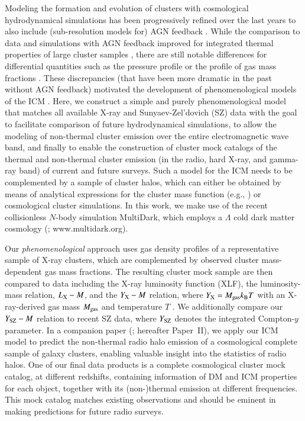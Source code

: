 \documentclass[useAMS,usenatbib]{mn2e}
\begin{document}
{  Modeling the formation and evolution of clusters with cosmological
  hydrodynamical simulations has been progressively refined over the last years
  to also include (sub-resolution models for) AGN feedback
  \citep[e.g.,][]{2007MNRAS.380..877S, 2008MNRAS.387.1403S, 2008ApJ...687L..53P,
    2012MNRAS.420.2662D, 2012MNRAS.424..190G, 2013MNRAS.428.2366V}. While the
  comparison to data and simulations with AGN feedback improved for integrated
  thermal properties of large cluster samples
  \citep{2012ApJ...758...74B,2012ApJ...758...75B}, there are still notable
  differences for differential quantities such as the pressure profile
  \citep{2013A&A...550A.131P} or the profile of gas mass fractions
  \citep{2012arXiv1209.4082B}. These discrepancies (that have been more dramatic
  in the past without AGN feedback) motivated the development of
  phenomenological models of the ICM \citep[e.g.,][]{2005ApJ...634..964O,
    2012MNRAS.422..686C}. Here, we construct a simple and purely
  phenomenological model that matches all available X-ray and Sunyaev-Zel'dovich
  (SZ) data with the goal to facilitate comparison of future hydrodynamical
  simulations, to allow the modeling of non-thermal cluster emission over the
  entire electromagnetic wave band, and finally to enable the construction of
  cluster mock catalogs of the thermal and non-thermal cluster emission (in the
  radio, hard X-ray, and gamma-ray band) of current and future surveys. Such a
  model for the ICM needs to be complemented by a sample of cluster halos, which
  can either be obtained by means of analytical expressions for the cluster mass
  function (e.g., \citealp{2001MNRAS.321..372J}) or cosmological cluster
  simulations. In this work, we make use of the recent collisionless $N$-body
  simulation MultiDark, which employs a $\Lambda$ cold dark matter cosmology
  (\citealp{2011arXiv1104.5130P}; www.multidark.org).

  Our \emph{phenomenological} approach uses gas density profiles of a
  representative sample of X-ray clusters, which are complemented by observed
  cluster mass-dependent gas mass fractions. The resulting cluster mock sample
  are then compared to data including the X-ray luminosity function (XLF), the
  luminosity-mass relation, $L_{{\mathrm{X}}}- M$, and the $Y_{{\mathrm{X}}}-M$ relation,
  where $Y_{{\mathrm{X}}}=M_{\mathrm{gas}}k_{{\mathrm{B}}}T$ with an X-ray-derived gas mass
  $M_{{\mathrm{gas}}}$ and temperature $T$ \citep{2006ApJ...650..128K}. We
  additionally compare our $Y_{{\mathrm{SZ}}}-M$ relation to recent SZ data, where
  $Y_{\mathrm{SZ}}$ denotes the integrated Compton-$y$ parameter.  In a companion
  paper (\citealp{paper2}; hereafter Paper~II), we apply our ICM model to
  predict the non-thermal radio halo emission of a cosmological complete sample of
  galaxy clusters, enabling valuable insight into the statistics of radio halos.
  One of our final data products is a complete cosmological cluster mock catalog,
  at different redshifts, containing information of DM and ICM properties for
  each object, together with its (non-)thermal emission at different
  frequencies. This mock catalog matches existing observations and should be
  eminent in making predictions for future radio surveys.

}
\end{document}
